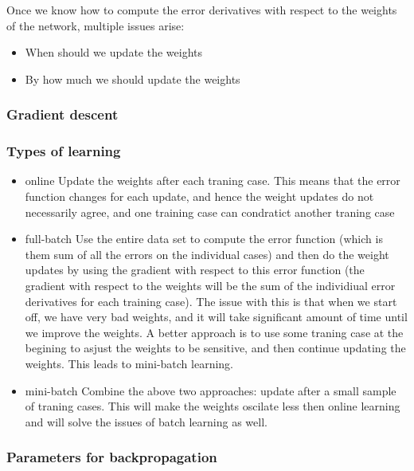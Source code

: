 \documentclass[11pt, fleqn, twoside]{article}
\begin{document}
  Once we know how to compute the error derivatives with respect to the weights of the network, multiple issues arise:

\begin{itemize}
    \item When should we update the weights
    \item By how much we should update the weights
\end{itemize}

\subsubsection{ Gradient descent}

\subsubsection{ Types of learning}

\begin{itemize}
  \item online
     Update the weights after each traning case. This means that the error function changes for each update, and hence the weight updates do not necessarily agree, and one training case can condratict another traning case
  \item full-batch
    Use the entire data set to compute the error function (which is them sum of all the errors on the individual cases) and then do the weight updates by using the gradient with respect to this error function (the gradient with respect to the weights will be the sum of the individiual error derivatives for each training case). The issue with this is that when we start off, we have very bad weights, and it will take significant amount of time until we improve the weights. A better approach is to use some traning case at the begining to asjust the weights to be sensitive, and then continue updating the weights. This leads to mini-batch learning.
  \item mini-batch
    Combine the above two approaches: update after a small sample of traning cases. This will make the weights oscilate less then online learning and will solve the issues of batch learning as well.
\end{itemize}

\subsubsection{ Parameters for backpropagation}
\end{document}
